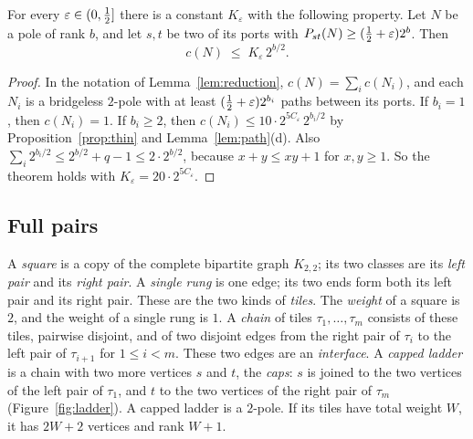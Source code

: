 \begin{theorem}\label{thm:fewcycles}
For every $\varepsilon\in(0,\tfrac12]$ there is a constant $K_\varepsilon$ with the following property.
Let $N$ be a pole of rank $b$, and let $s,t$ be two of its ports with
$P_{st}(N)\ge(\tfrac12+\varepsilon)2^{b}$. Then
\[
  c(N)\;\le\;K_\varepsilon\,2^{b/2}.
\]
\end{theorem}

\begin{proof}
In the notation of Lemma~\ref{lem:reduction}, $c(N)=\sum_ic(N_i)$, and each $N_i$ is a
bridgeless $2$-pole with at least $(\tfrac12+\varepsilon)2^{b_i}$ paths between its ports. If
$b_i=1$, then $c(N_i)=1$. If $b_i\ge2$, then $c(N_i)\le10\cdot2^{5C_\varepsilon}\,2^{b_i/2}$ by
Proposition~\ref{prop:thin} and Lemma~\ref{lem:path}(d). Also
$\sum_i2^{b_i/2}\le2^{b/2}+q-1\le2\cdot2^{b/2}$, because $x+y\le xy+1$ for $x,y\ge1$. So the
theorem holds with $K_\varepsilon=20\cdot2^{5C_\varepsilon}$.
\end{proof}

\subsection{Full pairs}\label{sec:full}

A \emph{square} is a copy of the complete bipartite graph $K_{2,2}$; its two classes are its
\emph{left pair} and its \emph{right pair}. A \emph{single rung} is one edge; its two ends form
both its left pair and its right pair. These are the two kinds of \emph{tiles}. The \emph{weight}
of a square is $2$, and the weight of a single rung is $1$. A \emph{chain} of tiles
$\tau_1,\dots,\tau_m$ consists of these tiles, pairwise disjoint, and of two disjoint edges from
the right pair of $\tau_i$ to the left pair of $\tau_{i+1}$ for $1\le i<m$. These two edges are an
\emph{interface}. A \emph{capped ladder} is a chain with two more vertices $s$ and $t$, the
\emph{caps}: $s$ is joined to the two vertices of the left pair of $\tau_1$, and $t$ to the two
vertices of the right pair of $\tau_m$ (Figure~\ref{fig:ladder}). A capped ladder is a $2$-pole. If
its tiles have total weight $W$, it has $2W+2$ vertices and rank $W+1$.

